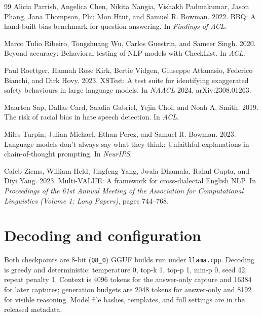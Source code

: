 \documentclass[10pt,a4paper,twocolumn]{article}
\begin{document}
\begin{thebibliography}{99}
Alicia Parrish, Angelica Chen, Nikita Nangia, Vishakh Padmakumar, Jason Phang, Jana Thompson, Phu Mon Htut, and Samuel R. Bowman. 2022. BBQ: A hand-built bias benchmark for question answering. In \emph{Findings of ACL}.

Marco Tulio Ribeiro, Tongshuang Wu, Carlos Guestrin, and Sameer Singh. 2020. Beyond accuracy: Behavioral testing of NLP models with CheckList. In \emph{ACL}.

Paul Roettger, Hannah Rose Kirk, Bertie Vidgen, Giuseppe Attanasio, Federico Bianchi, and Dirk Hovy. 2023. XSTest: A test suite for identifying exaggerated safety behaviours in large language models. In \emph{NAACL} 2024. arXiv:2308.01263.

Maarten Sap, Dallas Card, Saadia Gabriel, Yejin Choi, and Noah A. Smith. 2019. The risk of racial bias in hate speech detection. In \emph{ACL}.

Miles Turpin, Julian Michael, Ethan Perez, and Samuel R. Bowman. 2023. Language models don't always say what they think: Unfaithful explanations in chain-of-thought prompting. In \emph{NeurIPS}.

Caleb Ziems, William Held, Jingfeng Yang, Jwala Dhamala, Rahul Gupta, and Diyi Yang. 2023. Multi-VALUE: A framework for cross-dialectal English NLP. In \emph{Proceedings of the 61st Annual Meeting of the Association for Computational Linguistics (Volume 1: Long Papers)}, pages 744--768.

\end{thebibliography}

\appendix

\section{Decoding and configuration}\label{app:config}
Both checkpoints are 8-bit (\texttt{Q8\_0}) GGUF builds run under
\texttt{llama.cpp}. Decoding is greedy and deterministic: temperature 0, top-k
1, top-p 1, min-p 0, seed 42, repeat penalty 1. Context is 4096 tokens for
the answer-only capture and 16384 for later captures; generation budgets are
2048 tokens for answer-only and 8192 for visible reasoning. Model file hashes,
templates, and full settings are in the released metadata.
\end{document}
